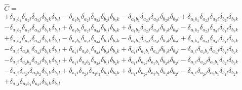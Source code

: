 \documentclass[a4paper, 11pt, notitlepage, english]{article}
\newcommand{\op}[1]{\hat{#1}}
\begin{document}
\begin{align*} &\op{C} = \\
&+\delta_{a_{1} b_{1}} \delta_{a_{2} i} \delta_{a_{3} j} \delta_{b_{2} k} \delta_{b_{3} l} 
- \delta_{a_{1} b_{1}} \delta_{a_{2} i} \delta_{a_{3} j} \delta_{b_{2} l} \delta_{b_{3} k} 
- \delta_{a_{1} b_{1}} \delta_{a_{2} j} \delta_{a_{3} i} \delta_{b_{2} k} \delta_{b_{3} l} 
+ \delta_{a_{1} b_{1}} \delta_{a_{2} j} \delta_{a_{3} i} \delta_{b_{2} l} \delta_{b_{3} k} \\
&- \delta_{a_{1} b_{2}} \delta_{a_{2} i} \delta_{a_{3} j} \delta_{b_{1} k} \delta_{b_{3} l} 
+ \delta_{a_{1} b_{2}} \delta_{a_{2} i} \delta_{a_{3} j} \delta_{b_{1} l} \delta_{b_{3} k} 
+ \delta_{a_{1} b_{2}} \delta_{a_{2} j} \delta_{a_{3} i} \delta_{b_{1} k} \delta_{b_{3} l} 
- \delta_{a_{1} b_{2}} \delta_{a_{2} j} \delta_{a_{3} i} \delta_{b_{1} l} \delta_{b_{3} k} \\
&+ \delta_{a_{1} b_{3}} \delta_{a_{2} i} \delta_{a_{3} j} \delta_{b_{1} k} \delta_{b_{2} l} 
- \delta_{a_{1} b_{3}} \delta_{a_{2} i} \delta_{a_{3} j} \delta_{b_{1} l} \delta_{b_{2} k} 
- \delta_{a_{1} b_{3}} \delta_{a_{2} j} \delta_{a_{3} i} \delta_{b_{1} k} \delta_{b_{2} l} 
+ \delta_{a_{1} b_{3}} \delta_{a_{2} j} \delta_{a_{3} i} \delta_{b_{1} l} \delta_{b_{2} k} \\
&- \delta_{a_{1} i} \delta_{a_{2} b_{1}} \delta_{a_{3} j} \delta_{b_{2} k} \delta_{b_{3} l} 
+ \delta_{a_{1} i} \delta_{a_{2} b_{1}} \delta_{a_{3} j} \delta_{b_{2} l} \delta_{b_{3} k} 
+ \delta_{a_{1} i} \delta_{a_{2} b_{2}} \delta_{a_{3} j} \delta_{b_{1} k} \delta_{b_{3} l} 
- \delta_{a_{1} i} \delta_{a_{2} b_{2}} \delta_{a_{3} j} \delta_{b_{1} l} \delta_{b_{3} k} \\
&- \delta_{a_{1} i} \delta_{a_{2} b_{3}} \delta_{a_{3} j} \delta_{b_{1} k} \delta_{b_{2} l} 
+ \delta_{a_{1} i} \delta_{a_{2} b_{3}} \delta_{a_{3} j} \delta_{b_{1} l} \delta_{b_{2} k} 
+ \delta_{a_{1} i} \delta_{a_{2} j} \delta_{a_{3} b_{1}} \delta_{b_{2} k} \delta_{b_{3} l} 
- \delta_{a_{1} i} \delta_{a_{2} j} \delta_{a_{3} b_{1}} \delta_{b_{2} l} \delta_{b_{3} k} \\
&- \delta_{a_{1} i} \delta_{a_{2} j} \delta_{a_{3} b_{2}} \delta_{b_{1} k} \delta_{b_{3} l} 
+ \delta_{a_{1} i} \delta_{a_{2} j} \delta_{a_{3} b_{2}} \delta_{b_{1} l} \delta_{b_{3} k} 
+ \delta_{a_{1} i} \delta_{a_{2} j} \delta_{a_{3} b_{3}} \delta_{b_{1} k} \delta_{b_{2} l} 
- \delta_{a_{1} i} \delta_{a_{2} j} \delta_{a_{3} b_{3}} \delta_{b_{1} l} \delta_{b_{2} k} \\
&+ \delta_{a_{1} j} \delta_{a_{2} b_{1}} \delta_{a_{3} i} \delta_{b_{2} k} \delta_{b_{3} l} 

\end{align*}
\end{document}
